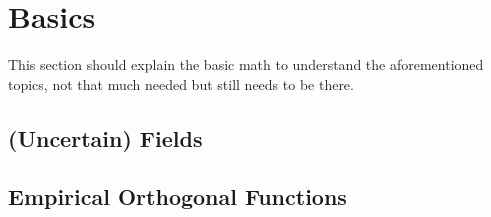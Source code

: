 
\chapter{Basics}
\label{ch:basics}

This section should explain the basic math to understand the aforementioned topics, not that much needed but still needs to be there.

\section{(Uncertain) Fields}
\label{sec:uncertainfields}

\section{Empirical Orthogonal Functions}
\label{sec:eof}

